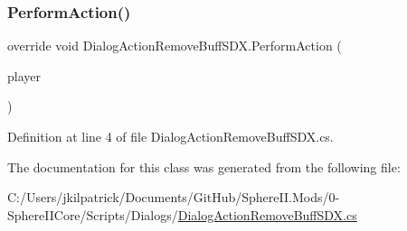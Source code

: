 \subsubsection{\texorpdfstring{PerformAction()}{PerformAction()}}
{\footnotesize\ttfamily override void Dialog\+Action\+Remove\+Buff\+S\+D\+X.\+Perform\+Action (\begin{DoxyParamCaption}\item[{Entity\+Player}]{player }\end{DoxyParamCaption})}



Definition at line 4 of file Dialog\+Action\+Remove\+Buff\+S\+D\+X.\+cs.



The documentation for this class was generated from the following file\+:\begin{DoxyCompactItemize}
\item 
C\+:/\+Users/jkilpatrick/\+Documents/\+Git\+Hub/\+Sphere\+I\+I.\+Mods/0-\/\+Sphere\+I\+I\+Core/\+Scripts/\+Dialogs/\mbox{\hyperlink{_dialog_action_remove_buff_s_d_x_8cs}{Dialog\+Action\+Remove\+Buff\+S\+D\+X.\+cs}}\end{DoxyCompactItemize}
